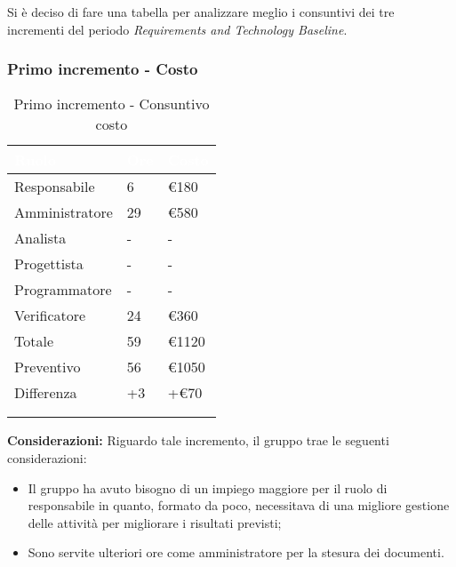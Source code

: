  { 
     Si è deciso di fare una tabella per analizzare meglio i consuntivi dei tre incrementi del periodo \textit{Requirements and Technology Baseline}.

\subsubsection{Primo incremento - Costo} 
{
      \setlength{\freewidth}{\dimexpr\textwidth-30\tabcolsep}
      \renewcommand{\arraystretch}{1.0}
      \centering
      \setlength{\aboverulesep}{0pt}
      \setlength{\belowrulesep}{0pt}
      \begin{longtable}{C{.4\freewidth} C{.2\freewidth} C{.2\freewidth}}
      \toprule
      \textcolor{white}{\textbf{Ruolo}}&
      \textcolor{white}{\textbf{Ore}}&
      \textcolor{white}{\textbf{Costo}}\\
      \toprule
      \endhead

      Responsabile & 6 & \euro180 \\
      Amministratore & 29 & \euro580 \\
      Analista & - & - \\
      Progettista & - & - \\
      Programmatore & - & - \\
      Verificatore & 24 & \euro360 \\
      Totale & 59 & \euro1120 \\
      Preventivo & 56 & \euro1050 \\
      Differenza & +3 & +\euro70 \\
      \bottomrule
      \\
      \caption{Primo incremento - Consuntivo costo}
      \end{longtable} 

      
      \textbf{Considerazioni:} 
        Riguardo tale incremento, il gruppo trae le seguenti considerazioni:
        \begin{itemize}
            \item Il gruppo ha avuto bisogno di un impiego maggiore per il ruolo di responsabile in quanto, formato da poco, necessitava di una migliore gestione delle attività per migliorare i risultati previsti;
            \item Sono servite ulteriori ore come amministratore per la stesura dei documenti.
        \end{itemize}

}}
